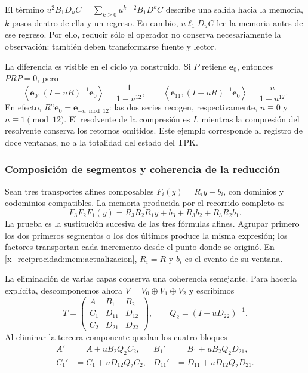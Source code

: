 El término \(u^2B_1D_uC=\sum_{k\geq0}u^{k+2}B_1D^kC\)
describe una salida hacia la memoria, \(k\) pasos dentro de ella y
un regreso. En cambio, \(u\ell_1D_uC\) lee la memoria antes de ese
regreso. Por ello, reducir sólo el operador no conserva necesariamente
la observación: también deben transformarse fuente y lector.

La diferencia es visible en el ciclo ya construido. Si \(P\) retiene
\(\mathbf e_0\), entonces \(PRP=0\), pero
\begin{equation}
 \left\langle\mathbf e_0,(I-uR)^{-1}\mathbf e_0\right\rangle
 =\frac1{1-u^{12}},\qquad
 \left\langle\mathbf e_{11},(I-uR)^{-1}\mathbf e_0\right\rangle
 =\frac u{1-u^{12}}.
 \label{x_reciprocidad:mem:ejemplo-ciclo}
\end{equation}
En efecto, \(R^n\mathbf e_0=\mathbf e_{-n\bmod12}\): las
dos series recogen, respectivamente, \(n\equiv0\) y
\(n\equiv1\pmod{12}\). El resolvente de la compresión es \(I\),
mientras la compresión del resolvente conserva los retornos omitidos.
Este ejemplo corresponde al registro de doce ventanas, no a la totalidad
del estado del TPK.

\subsubsection{Composición de segmentos y coherencia de la reducción}

Sean tres transportes afines composables
\(F_i(y)=R_i y+b_i\), con dominios y codominios compatibles.
La memoria producida por el recorrido completo es
\begin{equation}
 F_3F_2F_1(y)
 =R_3R_2R_1y+b_3+R_3b_2+R_3R_2b_1.
 \label{x_reciprocidad:mem:cociclo-tres}
\end{equation}
La prueba es la sustitución sucesiva de las tres fórmulas afines.
Agrupar primero los dos primeros segmentos o los dos últimos produce
la misma expresión; los factores transportan cada incremento desde
el punto donde se originó. En \eqref{x_reciprocidad:mem:actualizacion},
\(R_i=R\) y \(b_i\) es el evento de su ventana.

La eliminación de varias capas conserva una coherencia semejante.
Para hacerla explícita, descomponemos ahora
\(V=V_0\oplus V_1\oplus V_2\) y escribimos
\[
 T=\begin{pmatrix}
 A&B_1&B_2\\C_1&D_{11}&D_{12}\\C_2&D_{21}&D_{22}
 \end{pmatrix},\qquad Q_2=(I-uD_{22})^{-1}.
\]
Al eliminar la tercera componente quedan los cuatro bloques
\begin{equation}
 \begin{aligned}
 A'&=A+uB_2Q_2C_2,&
 B_1'&=B_1+uB_2Q_2D_{21},\\
 C_1'&=C_1+uD_{12}Q_2C_2,&
 D_{11}'&=D_{11}+uD_{12}Q_2D_{21}.
 \end{aligned}
 \label{x_reciprocidad:mem:schur-intermedio}
\end{equation}

